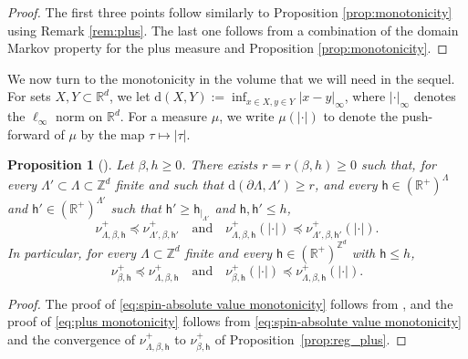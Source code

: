 \documentclass[11pt,a4paper]{article}
\numberwithin{equation}{section}
\theoremstyle{plain}
\newtheorem{Prop}[Thm]{Proposition}
\theoremstyle{definition}
\begin{document}
\begin{proof} The first three points follow similarly to Proposition \ref{prop:monotonicity} using Remark \ref{rem:plus}. The last one follows from a combination of the domain Markov property for the plus measure and Proposition \ref{prop:monotonicity}.
\end{proof}

We now turn to the monotonicity in the volume that we will need in the sequel. For sets $X,Y\subset \mathbb R^d$, we let $\mathrm{d}(X,Y):=\inf_{x\in X, y\in Y}|x-y|_\infty$, where $|\cdot|_\infty$ denotes the $\ell_\infty$ norm on $\mathbb R^d$. For a measure $\mu$, we write $\mu(|\cdot|)$ to denote the push-forward of $\mu$ by the map $\tau\mapsto |\tau|$.


\begin{Prop}[]\label{prop:monotonicity in plus}
Let $\beta,h \geq 0$. There exists $r=r(\beta,h)\geq 0$ such that, for every $\Lambda'\subset \Lambda \subset \mathbb Z^d$ finite and such that $\mathrm{d}(\partial \Lambda,\Lambda')\geq r$, and every $\mathsf h \in (\mathbb R^+)^{\Lambda}$ and $\mathsf h' \in (\mathbb R^+)^{\Lambda'}$ such that $\mathsf h' \geq \mathsf h_{|_{\Lambda'}}$ and $\mathsf h,\mathsf h'\leq h$,
\begin{equation}\label{eq:spin-absolute value monotonicity}
\nu_{\Lambda,\beta, \mathsf h}^+ \preccurlyeq \nu_{\Lambda',\beta, \mathsf h'}^+ \quad \text{and} \quad \nu_{\Lambda,\beta, \mathsf h}^+(|\cdot|) \preccurlyeq \nu_{\Lambda',\beta, \mathsf h'}^+(|\cdot|).
\end{equation}
In particular, for every $\Lambda \subset \mathbb Z^d$ finite and every $\mathsf h \in (\mathbb R^+)^{\mathbb Z^d}$ with $\mathsf h \leq h$,
\begin{equation}\label{eq:plus monotonicity}
\nu_{\beta,\mathsf h}^+ \preccurlyeq \nu_{\Lambda,\beta, \mathsf h}^+ \quad \text{and} \quad \nu_{\beta, \mathsf h}^+(|\cdot|) \preccurlyeq \nu_{\Lambda,\beta, \mathsf h}^+(|\cdot|).
\end{equation}
\end{Prop}

\begin{proof}
The proof of \eqref{eq:spin-absolute value monotonicity} follows from \cite[Proposition 6.11]{PV26}, and the proof of
\eqref{eq:plus monotonicity} follows from \eqref{eq:spin-absolute value monotonicity} and the convergence of 
$\nu^+_{\Lambda,\beta, \mathsf{h}}$ to $\nu^+_{\beta, \mathsf{h}}$ of Proposition~\ref{prop:reg_plus}.
\end{proof}
\end{document}
